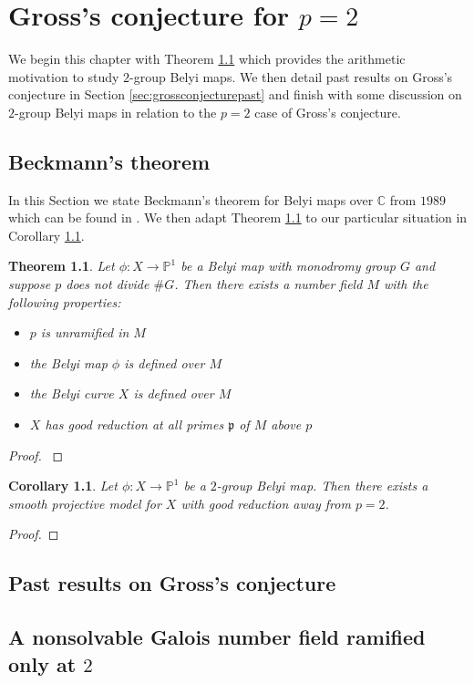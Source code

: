 \documentclass{dcthesis}
\newcommand{\PP}{\mathbb P}
\newcommand{\CC}{\mathbb C}
\newtheorem{theorem}[prop]{Theorem}
\newtheorem{corr}[prop]{Corollary}
\theoremstyle{definition}
\theoremstyle{remark}
\numberwithin{equation}{section}
\numberwithin{figure}{section}
\begin{document}
\chapter{Gross's conjecture for $p=2$}{\label{chapter:grossconjecture}
  We begin this chapter with Theorem \ref{thm:beckmann} which provides
  the arithmetic motivation to study $2$-group Belyi maps.
  We then detail past results on Gross's conjecture in Section
  \ref{sec:grossconjecturepast}
  and finish with some discussion on $2$-group Belyi maps
  in relation to the $p=2$ case of Gross's conjecture.
  \section{Beckmann's theorem}{\label{sec:beckmann}
    In this Section we state Beckmann's theorem
    for Belyi maps over $\CC$
    from
    $1989$ which can be found in \cite{beckmann}.
    We then adapt Theorem \ref{thm:beckmann}
    to our particular situation in
    Corollary \ref{cor:beckmann}.
    \begin{theorem}\label{thm:beckmann}
      Let $\phi:X\to\PP^1$ be a Belyi map with
      monodromy group $G$
      and suppose $p$ does not divide $\# G$.
      Then there exists a number field $M$
      with the following properties:
      \begin{itemize}
        \item
          $p$ is unramified in $M$
        \item
          the Belyi map $\phi$ is defined over $M$
        \item
          the Belyi curve $X$ is defined over $M$
        \item
          $X$ has good reduction at all primes $\mathfrak{p}$
          of $M$ above $p$
      \end{itemize}
    \end{theorem}
    \begin{proof}
      \cite{beckmann}
    \end{proof}
    \begin{corr}\label{cor:beckmann}
      Let $\phi:X\to\PP^1$ be a $2$-group Belyi map.
      Then there exists a smooth projective model for $X$
      with good reduction away from $p=2$.
    \end{corr}
    \begin{proof}
    \end{proof}
  }
  \section{Past results on Gross's conjecture}{\label{sec:grossconjecturepast}
  }
  \section{A nonsolvable Galois number field ramified only at $2$}{\label{sec:numberfieldramifiedat2}
  }
}
\end{document}
